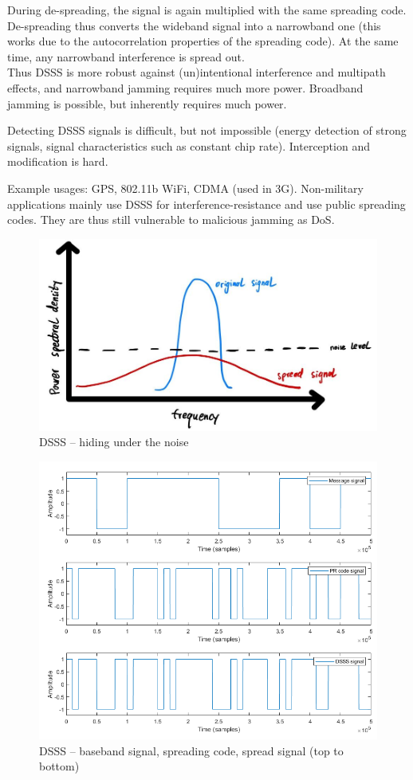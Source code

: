 During de-spreading, the signal is again multiplied with the same spreading code.
De-spreading thus converts the wideband signal into a narrowband one (this works due to the autocorrelation properties of the spreading code).
At the same time, any narrowband interference is spread out.
\\
Thus DSSS is more robust against (un)intentional interference and multipath effects, and narrowband jamming requires much more power.
Broadband jamming is possible, but inherently requires much power.

Detecting DSSS signals is difficult, but not impossible (energy detection of strong signals, signal characteristics such as constant chip rate).
Interception and modification is hard.

Example usages: GPS, 802.11b WiFi, CDMA (used in 3G).
Non-military applications mainly use DSSS for interference-resistance and use public spreading codes.
They are thus still vulnerable to malicious jamming as DoS.

\begin{figure}
	\centering
	\includegraphics[scale=0.4]{images/2-dsss-psd.jpg}
	\caption{DSSS -- hiding under the noise}
	\label{fig:dsss-psd}
\end{figure}

\begin{figure}
	\centering
	\includegraphics[scale=0.6]{images/2-dsss.png}
	\caption{DSSS -- baseband signal, spreading code, spread signal (top to bottom)}
	\label{fig:dsss}
\end{figure}

